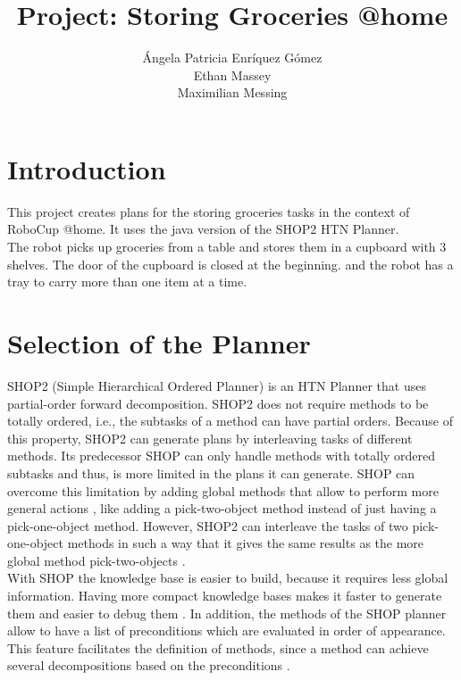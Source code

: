 \documentclass[paper=a4, fontsize=11pt]{scrartcl}
\title{Project: Storing Groceries @home}
\author{\'{A}ngela Patricia Enr\'{i}quez G\'{o}mez \\
	Ethan Massey \\
	Maximilian Messing}
\begin{document}
	
	\maketitle 
	
 	\section{Introduction} 
 	
 	This project creates plans for the storing groceries tasks in the context of RoboCup @home. It uses the java version of the SHOP2 HTN Planner. \\
 	
 	The robot picks up groceries from a table and stores them in a cupboard with 3 shelves. The door of the cupboard is closed at the beginning.
 	and the robot has a tray to carry more than one item at a time.
 	
 	\section{Selection of the Planner}
 
 	SHOP2 (Simple Hierarchical Ordered Planner) is an HTN Planner that uses partial-order forward decomposition. SHOP2 does not require methods to be totally ordered, i.e., the subtasks of a method can have partial orders. Because of this property, SHOP2 can generate plans by interleaving tasks of different methods. Its predecessor SHOP can only handle methods with totally ordered subtasks and thus, is more limited in the plans it can generate. SHOP can overcome this limitation by adding global methods that allow to perform more general actions \cite{Nau2001}, like adding a pick-two-object method instead of just having a pick-one-object method. However, SHOP2 can interleave the tasks of two pick-one-object methods in such a way that it gives the same results as the more global method pick-two-objects \cite{slides}. \\
 	
 	With SHOP the knowledge base is easier to build, because it requires less global information. Having more compact knowledge bases makes it faster to generate them and easier to debug them \cite{Nau2001}. In addition, the methods of the SHOP planner allow to have a list of preconditions which are evaluated in order of appearance. This feature facilitates the definition of methods, since a method can achieve several decompositions based on the preconditions \cite{Nau2003}. \\
 	
\end{document}
